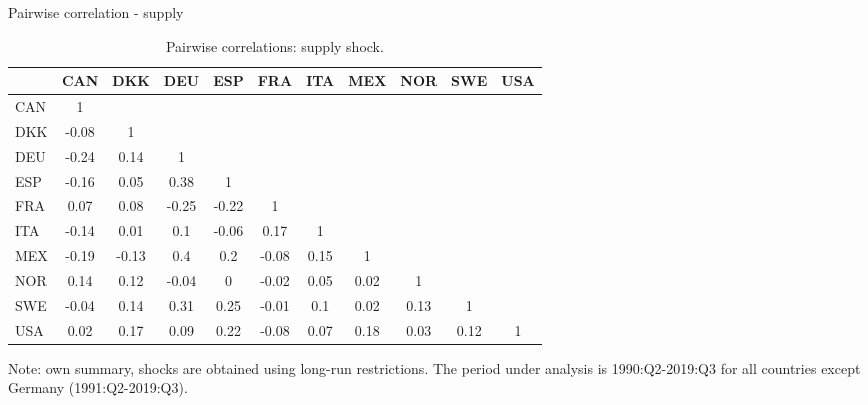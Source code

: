 \documentclass[10pt,leqno,aspectratio=169,presentation]{beamer} %
\begin{document}
\begin{frame}{Pairwise correlation - supply}
\setcounter{table}{0}
\label{main}
\begin{table}[H]
\captionsetup{justification=raggedright,
singlelinecheck=false
}
    \centering
    \scriptsize
    \caption{Pairwise correlations: supply shock.}  
    \begin{tabular}{l ccc ccc ccc c}
    \toprule
 & CAN & DKK & DEU & ESP & FRA & ITA & MEX & NOR & SWE & USA \\ 
  \hline
CAN & 1 &  &  &  &  &  &  &  &  &  \\ 
  DKK & -0.08 & 1 &  &  &  &  &  &  &  &  \\ 
  DEU & -0.24 & 0.14 & 1 &  &  &  &  &  &  &  \\ 
  ESP & -0.16 & 0.05 & 0.38 & 1 &  &  &  &  &  &  \\ 
  FRA & 0.07 & 0.08 & -0.25 & -0.22 & 1 &  &  &  &  &  \\ 
  ITA & -0.14 & 0.01 & 0.1 & -0.06 & 0.17 & 1 &  &  &  &  \\ 
  MEX & -0.19 & -0.13 & 0.4 & 0.2 & -0.08 & 0.15 & 1 &  &  &  \\ 
  NOR & 0.14 & 0.12 & -0.04 & 0 & -0.02 & 0.05 & 0.02 & 1 &  &  \\ 
  SWE & -0.04 & 0.14 & 0.31 & 0.25 & -0.01 & 0.1 & 0.02 & 0.13 & 1 &  \\ 
  USA & 0.02 & 0.17 & 0.09 & 0.22 & -0.08 & 0.07 & 0.18 & 0.03 & 0.12 & 1 \\ 
  \bottomrule
    \end{tabular}
    \begin{minipage}{\textwidth}
    \vspace{0.1cm} 
    \footnotesize Note: own summary, shocks are obtained using long-run restrictions. The period under analysis is 1990:Q2-2019:Q3 for all countries except Germany (1991:Q2-2019:Q3).
    \end{minipage}
    \label{table:a2}
\end{table}
\end{frame}
\end{document}
